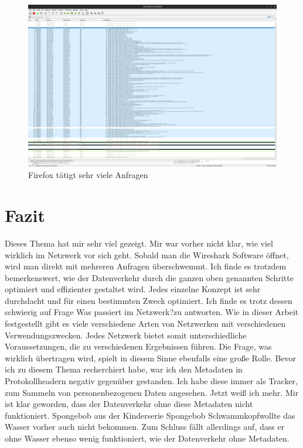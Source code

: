 \documentclass[12pt]{article}
\begin{document}
\begin{figure}[h]
	\centering
	\includegraphics[scale=0.18]{Bilder/firefox-anfragen}
	\caption{Firefox tätigt sehr viele Anfragen\cite{screenshots-self}}
	\label{fig:figure12}
\end{figure}

\section{Fazit}

Dieses Thema hat mir sehr viel gezeigt. Mir war vorher nicht klar, wie viel wirklich im Netzwerk vor sich geht. Sobald man die Wireshark Software öffnet, wird man direkt mit mehreren Anfragen überschwemmt. Ich finde es trotzdem bemerkenswert, wie der Datenverkehr durch die ganzen oben genannten Schritte optimiert und effizienter gestaltet wird. Jedes einzelne Konzept ist sehr durchdacht und für einen bestimmten Zweck optimiert. Ich finde es trotz dessen schwierig auf Frage \glqq Was passiert im Netzwerk?\grqq zu antworten. Wie in dieser Arbeit festgestellt gibt es viele verschiedene Arten von Netzwerken mit verschiedenen Verwendungszwecken. Jedes Netzwerk bietet somit unterschiedliche Voraussetzungen, die zu verschiedenen Ergebnissen führen. Die Frage, was wirklich übertragen wird, spielt in diesem Sinne ebenfalls eine große Rolle. Bevor ich zu diesem Thema recherchiert habe, war ich den Metadaten in Protokollheadern negativ gegenüber gestanden. Ich habe diese immer als Tracker, zum Sammeln von personenbezogenen Daten angesehen. Jetzt weiß ich mehr. Mir ist klar geworden, dass der Datenverkehr ohne diese Metadaten nicht funktioniert. Spongebob aus der Kinderserie \glqq Spongebob Schwammkopf\grqq wollte das Wasser vorher auch nicht bekommen. Zum Schluss fällt allerdings auf, dass er ohne Wasser ebenso wenig funktioniert, wie der Datenverkehr ohne Metadaten.
\end{document}
